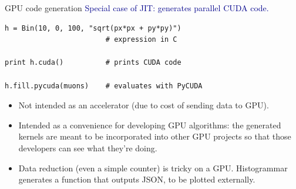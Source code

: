 \documentclass[aspectratio=169]{beamer}
\begin{document}
\begin{frame}[fragile]{GPU code generation}
\vspace{0.5 cm}
\textcolor{darkblue}{\large Special case of JIT: generates parallel CUDA code.}

\begin{center}
\begin{minipage}{0.7\linewidth}
\small
\begin{verbatim}
h = Bin(10, 0, 100, "sqrt(px*px + py*py)")
                        # expression in C

print h.cuda()          # prints CUDA code

h.fill.pycuda(muons)    # evaluates with PyCUDA
\end{verbatim}
\end{minipage}
\end{center}

\large
\begin{itemize}
\item<2-> Not intended as an accelerator (due to cost of sending data to GPU).
\item<3-> Intended as a convenience for developing GPU algorithms: the generated kernels are meant to be incorporated into other GPU projects so that those developers can see what they're doing.
\item<4-> Data reduction (even a simple counter) is tricky on a GPU. Histogrammar generates a function that outputs JSON, to be plotted externally.
\end{itemize}
\end{frame}
\end{document}
